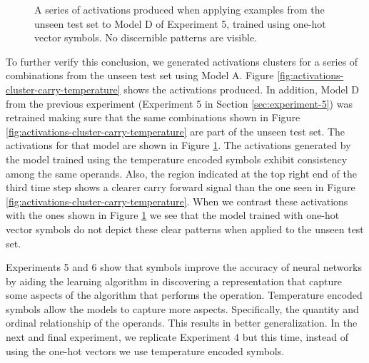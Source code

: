 \begin{figure}%
	\centering
	
	\caption{A series of activations produced when applying examples from the unseen test set to Model D of Experiment 5, trained using one-hot vector symbols. No discernible patterns are visible.}%
	\label{fig:activations-cluster-no-carry}%
\end{figure}

To further verify this conclusion, we generated activations clusters for a series of combinations from the unseen test set using Model A. Figure \ref{fig:activations-cluster-carry-temperature} shows the activations produced. In addition, Model D from the previous experiment (Experiment 5 in Section \ref{sec:experiment-5}) was retrained making sure that the same combinations shown in Figure \ref{fig:activations-cluster-carry-temperature} are part of the unseen test set. The activations for that model are shown in Figure \ref{fig:activations-cluster-no-carry}. The activations generated by the model trained using the temperature encoded symbols exhibit consistency among the same operands. Also, the region indicated at the top right end of the third time step shows a clearer carry forward signal than the one seen in Figure \ref{fig:activations-cluster-carry-temperature}. When we contrast these activations with the ones shown in Figure \ref{fig:activations-cluster-no-carry} we see that the model trained with one-hot vector symbols do not depict these clear patterns when applied to the unseen test set.

Experiments 5 and 6 show that symbols improve the accuracy of neural networks by aiding the learning algorithm in discovering a representation that capture some aspects of the algorithm that performs the operation. Temperature encoded symbols allow the models to capture more aspects. Specifically, the quantity and ordinal relationship of the operands. This results in better generalization. In the next and final experiment, we replicate Experiment 4 but this time, instead of using the one-hot vectors we use temperature encoded symbols.